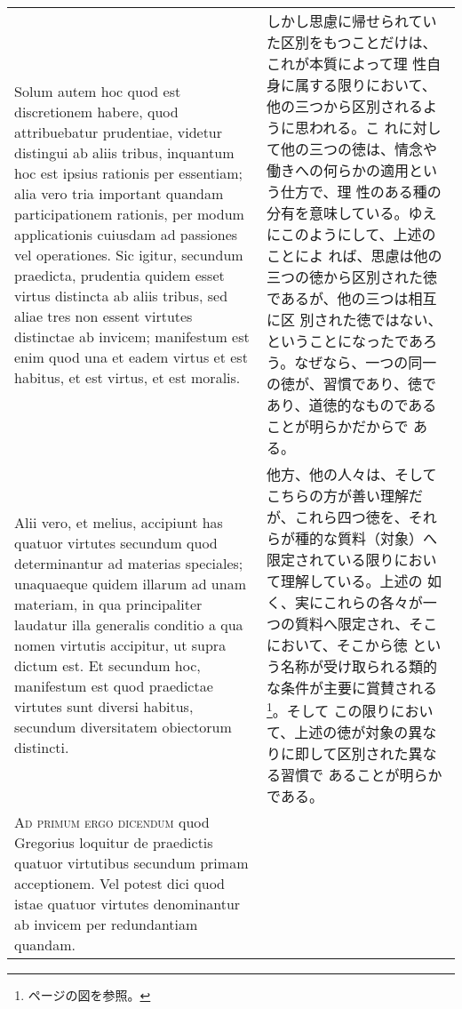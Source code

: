 \documentclass[10pt]{jsarticle}
\begin{document}
\begin{longtable}{p{21em}p{21em}}
\\


  Solum autem hoc quod est discretionem habere, quod attribuebatur
  prudentiae, videtur distingui ab aliis tribus, inquantum hoc est
  ipsius rationis per essentiam; alia vero tria important quandam
  participationem rationis, per modum applicationis cuiusdam ad
  passiones vel operationes. Sic igitur, secundum praedicta, prudentia
  quidem esset virtus distincta ab aliis tribus, sed aliae tres non
  essent virtutes distinctae ab invicem; manifestum est enim quod una
  et eadem virtus et est habitus, et est virtus, et est moralis.

&

 しかし思慮に帰せられていた区別をもつことだけは、これが本質によって理
 性自身に属する限りにおいて、他の三つから区別されるように思われる。こ
 れに対して他の三つの徳は、情念や働きへの何らかの適用という仕方で、理
 性のある種の分有を意味している。ゆえにこのようにして、上述のことによ
 れば、思慮は他の三つの徳から区別された徳であるが、他の三つは相互に区
 別された徳ではない、ということになったであろう。なぜなら、一つの同一
 の徳が、習慣であり、徳であり、道徳的なものであることが明らかだからで
 ある。

 
\\

 Alii vero, et melius, accipiunt has quatuor virtutes secundum quod
 determinantur ad materias speciales; unaquaeque quidem illarum ad
 unam materiam, in qua principaliter laudatur illa generalis conditio
 a qua nomen virtutis accipitur, ut supra dictum est. Et secundum hoc,
 manifestum est quod praedictae virtutes sunt diversi habitus,
 secundum diversitatem obiectorum distincti.

&

他方、他の人々は、そしてこちらの方が善い理解だが、これら四つ徳を、それ
らが種的な質料（対象）へ限定されている限りにおいて理解している。上述の
如く、実にこれらの各々が一つの質料へ限定され、そこにおいて、そこから徳
という名称が受け取られる類的な条件が主要に賞賛される
\footnote{\pageref{schema:cardinal_virtues}ページの図を参照。}。そして
この限りにおいて、上述の徳が対象の異なりに即して区別された異なる習慣で
あることが明らかである。
 
 
\\



{\scshape Ad primum ergo dicendum} quod Gregorius loquitur de
praedictis quatuor virtutibus secundum primam acceptionem. Vel potest
dici quod istae quatuor virtutes denominantur ab invicem per
 redundantiam quandam.


\end{longtable}
\end{document}
